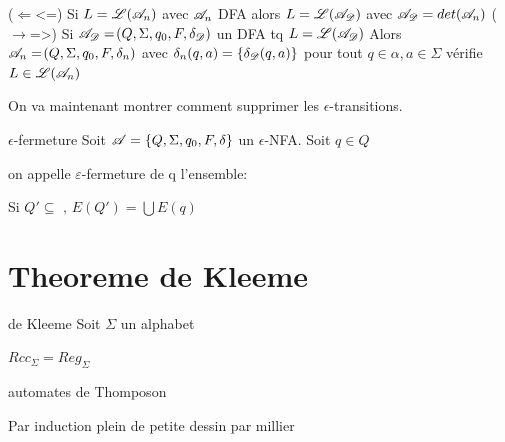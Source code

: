 \documentclass[a4paper,french,bookmarks]{book}
\begin{document}
    \begin{nproof}
        ($\Leftarrow$<=) Si $L = \mathscr{L} \!\left(\mathscr{A}_n\right)$ avec $\mathscr{A}_n$ DFA alors $L = \mathscr{L} \!\left(\mathscr{A}_{\mathscr{D}}\right)$ avec $\mathscr{A}_{\mathscr{D}} = det \!\left(\mathscr{A}_n\right)$
        ($\rightarrow$=>) Si $\mathscr{A}_{\mathscr{D}} = \!\left(Q, \Sigma, q_0, F, \delta_{\mathscr{D}}\right)$ un DFA tq $L = \mathscr{L} \!\left(\mathscr{A}_{\mathscr{D}}\right)$
        Alors$\mathscr{A}_n = \!\left(Q, \Sigma, q_0, F, \delta_n\right)$ avec $\delta_n \!\left(q, a\right) = \left\{\delta_{\mathscr{D}} \!\left(q, a\right)\right\}$ pour tout $q \in \alpha, a \in \Sigma$ vérifie $L \in \mathscr{L} \!\left(\mathscr{A}_n\right)$
    \end{nproof}
    
    On va maintenant montrer comment supprimer les $\epsilon$-transitions.
    
    \begin{definition}{$\epsilon$-fermeture}{}
        Soit $\mathscr{A} = \left\{Q, \Sigma, q_0, F, \delta\right\}$ un $\epsilon$-NFA. 
        Soit $q\in Q $ %
        
        on appelle $\varepsilon$-fermeture de q l'ensemble: 
        
        
    \end{definition}
    \begin{notation}
        Si $Q' \subseteq \text{  , } E(Q') = \bigcup E(q) $ 
        
    \end{notation}
    
    
    \section{Theoreme de Kleeme}
    
    \begin{theorem}{de Kleeme}{}
    Soit $\Sigma$ un alphabet 
    
    
    $Rcc_\Sigma = Reg_\Sigma$
    
    
    \end{theorem}
    \begin{definition}{automates de Thomposon}{}
        
    \end{definition}
    
    \begin{nproof}{Par induction}
        plein de petite dessin par millier 
        
    \end{nproof}
    
\end{document}
